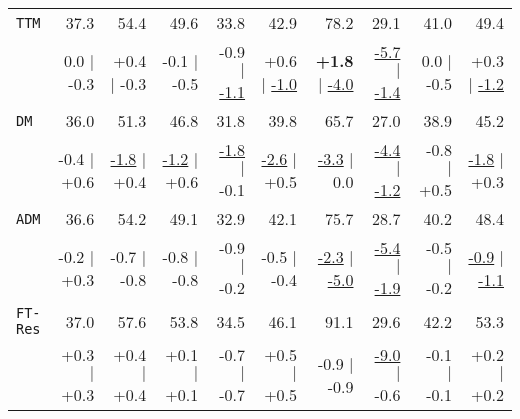 \documentclass[11pt,a4paper]{article}
\newcommand{\revision}[1]{#1}
\newcommand{\system}[1]{\texttt{{#1}}}
\newcommand{\SB}[1]{\textbf{#1}}
\newcommand{\SW}[1]{\underline{#1}}
\newcommand{\sbcl}[2]{{\scriptsize #1 \hfill $|$ \hfill  #2}}
\begin{document}
\begin{table*}
\begin{tabular}{|p{1.6cm}|*{9}{r|}}
    \footnotesize \system{TTM}           &  37.3 & 54.4   & 49.6    & 33.8  &  42.9  &78.2  & 29.1 & 41.0 & 49.4\\[-2pt]
                    & \sbcl{0.0}{-0.3}  & \sbcl{+0.4}{-0.3}  & \sbcl{-0.1}{-0.5}  & \sbcl{-0.9}{\SW{-1.1}}  & \sbcl{+0.6}{\SW{-1.0}}  & \sbcl{\SB{+1.8}}{\SW{-4.0}} & \sbcl{\SW{-5.7}}{\SW{-1.4}} & \sbcl{0.0}{-0.5} & \sbcl{+0.3}{\SW{-1.2}}\\
    
    \footnotesize \system{DM}            &36.0 &51.3&46.8&31.8&39.8&65.7&27.0 & 38.9 & 45.2\\[-2pt]
                   & \sbcl{-0.4}{+0.6} & \sbcl{\SW{-1.8}}{+0.4} & \sbcl{\SW{-1.2}}{+0.6} & \sbcl{\SW{-1.8}}{-0.1} & \sbcl{\SW{-2.6}}{+0.5} & \sbcl{\SW{-3.3}}{0.0} & \sbcl{\SW{-4.4}}{\SW{-1.2}} & \sbcl{-0.8}{+0.5} & \sbcl{\SW{-1.8}}{+0.3}\\    
    
    \footnotesize \system{ADM}          &36.6&54.2&49.1&32.9&42.1&75.7&28.7 & 40.2 & 48.4 \\[-2pt]
                   & \sbcl{-0.2}{+0.3} & \sbcl{-0.7}{-0.8} & \sbcl{-0.8}{-0.8} & \sbcl{-0.9}{-0.2} & \sbcl{-0.5}{-0.4} & \sbcl{\SW{-2.3}}{\SW{-5.0}} & \sbcl{\SW{-5.4}}{\SW{-1.9}} & \sbcl{-0.5}{-0.2} & \sbcl{\SW{-0.9}}{\SW{-1.1}}\\
    
    \footnotesize \revision{\system{FT-Res}}  & 37.0 & 57.6 & 53.8 & 34.5 &	46.1 & 91.1 & 29.6 &	42.2  & 53.3 \\[-2pt]
                               & \sbcl{+0.3}{+0.3} & \sbcl{+0.4}{+0.4} & \sbcl{+0.1}{+0.1} & \sbcl{-0.7}{-0.7} & \sbcl{+0.5}{+0.5} & \sbcl{-0.9}{-0.9} & \sbcl{\SW{-9.0}}{-0.6} & \sbcl{-0.1}{-0.1} & \sbcl{+0.2}{+0.2} \\
    

\end{tabular}
\end{table*}
\end{document}
